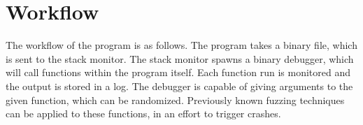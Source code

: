 \documentclass{article}
\begin{document}
\section{Workflow}

The workflow of the program is as follows. The program takes a binary file, which is sent to the stack monitor. The stack monitor spawns a binary debugger, which will call functions within the program itself. Each function run is monitored and the output is stored in a log. The debugger is capable of giving arguments to the given function, which can be randomized. Previously known fuzzing techniques can be applied to these functions, in an effort to trigger crashes.
\end{document}
